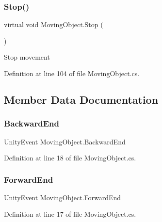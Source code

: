 \subsubsection{\texorpdfstring{Stop()}{Stop()}}
{\footnotesize\ttfamily virtual void Moving\+Object.\+Stop (\begin{DoxyParamCaption}{ }\end{DoxyParamCaption})\hspace{0.3cm}{\ttfamily [virtual]}}



Stop movement 



Definition at line 104 of file Moving\+Object.\+cs.



\subsection{Member Data Documentation}
\mbox{\label{class_moving_object_a0de14b03f3e49dad9b1904313d801f93}} 
\subsubsection{\texorpdfstring{Backward\+End}{BackwardEnd}}
{\footnotesize\ttfamily Unity\+Event Moving\+Object.\+Backward\+End}



Definition at line 18 of file Moving\+Object.\+cs.

\mbox{\label{class_moving_object_a4a63d850725f5e7e2f2ac3b9ab24d3d3}} 
\subsubsection{\texorpdfstring{Forward\+End}{ForwardEnd}}
{\footnotesize\ttfamily Unity\+Event Moving\+Object.\+Forward\+End}



Definition at line 17 of file Moving\+Object.\+cs.

\mbox{\label{class_moving_object_aecd5303443cf8969680edd8bffa34983}} 
